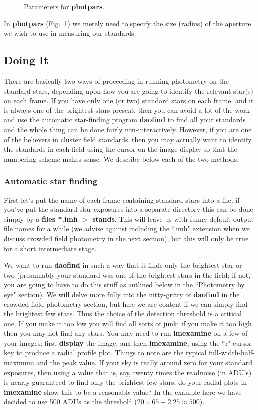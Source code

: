 \begin{figure}
\vspace{2.7in}
\caption{\label{photphotpars} Parameters for {\bf photpars}.}
\end{figure}
In {\bf photpars} (Fig.~\ref{photphotpars}) 
we merely need to specify the size (radius) of the
aperture we wish to use in measuring our standards.
 
\subsection{Doing It}
There are basically two ways of proceeding in running photometry on the
standard stars, depending upon how you are going to identify the
relevant star(s) on each frame.  If you have only one (or two)
standard stars on each frame, and it is always one of the brightest
stars present, then you can avoid a lot of the work and use the
automatic star-finding program {\bf daofind} to find all your standards
and the whole thing can be done fairly non-interactively.  However,
if you are one of the believers in cluster field standards, then you
may actually want to identify the standards in each field using the
cursor on the image display so that the numbering scheme makes sense.
We describe below each of the two methods.  
 
\subsubsection{Automatic star finding}
First let's put the name of each frame containing standard stars into
a file; if you've put the standard star exposures into a separate
directory this can be done simply by a {\bf files *.imh $>$ stands}.
This will leave us with funny default output file 
names for a while (we advise against
including the ``.imh" extension when we discuss crowded field photometry
in the next section), but this will only be true for a short
intermediate
stage. 
 
We want to run {\bf daofind} in such a way that it finds only the
brightest
star or two (presumably your standard was one of the brightest stars
in the field;
if not, you are going to have to do this stuff as outlined below in
the ``Photometry by eye" section).  We will delve more fully into the
nitty-gritty of {\bf daofind} in the crowded-field photometry section,
but here we are content if we can simply find the brightest few stars.
Thus the choice of the detection
threshold is a critical one.  If you make it too low you will find all
sorts of junk; if you make it too high then you may not find any stars.
You may need to run {\bf imexamine} on a few of your images: first
{\bf display} the image, and then {\bf imexamine}, using the ``r" cursor
key to produce a radial profile plot.  Things to note are the
typical full-width-half-maximum and the peak value.  If your sky is
really around zero for your standard exposures, then using a value
that is, say, twenty times the readnoise (in ADU's) is nearly guaranteed to
find only the brightest few stars; do your radial plots in {\bf
imexamine} show this to be a reasonable value?  In the example here we
have decided to use 500 ADUs as the threshold ($20 \times 65 \div 2.25
\approx 500$).
 
